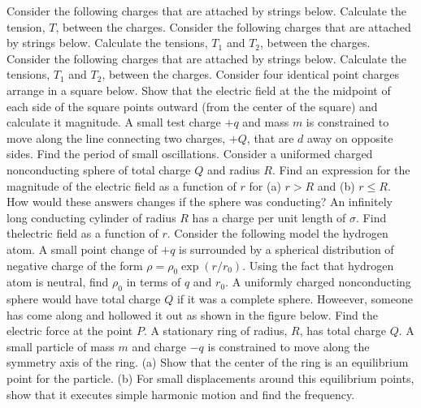 \documentclass[12pt]{article}
\begin{document}
\pagestyle{empty}
\noindent Consider the following charges that are attached by strings below.  Calculate the tension, $T$, between the charges.
\newpage
\noindent Consider the following charges that are attached by strings below.  Calculate the tensions, $T_1$ and $T_2$, between the charges.
\newpage 
\noindent Consider the following charges that are attached by strings below.  Calculate the tensions, $T_1$ and $T_2$, between the charges.
\newpage
\noindent Consider four identical point charges arrange in a square below.  Show that the electric field at the the midpoint of each side of the square points outward (from the center of the square) and calculate it magnitude.
\newpage
\noindent A small test charge $+q$ and mass $m$ is constrained to move along the line connecting two charges, $+Q$, that are $d$ away on opposite sides.  Find the period of small oscillations.   
\newpage
\noindent Consider a uniformed charged nonconducting sphere of total charge $Q$ and radius $R$.  Find an expression for the magnitude of the electric field as a function of $r$ for (a) $r>R$ and (b) $r\le R$.  How would these answers changes if the sphere was conducting?
\newpage
\noindent An infinitely long conducting cylinder of radius $R$ has a charge per unit length of $\sigma$.  Find thelectric field as a function of $r$.  
\newpage
\noindent Consider the following model the hydrogen atom.  A small point change of $+q$ is surrounded by a spherical distribution of negative charge of the form $\rho = \rho_0 \exp( r/r_0)$.  Using the fact that hydrogen atom is neutral, find $\rho_0$ in terms of $q$ and $r_0$.
\newpage
\noindent A uniformly charged nonconducting sphere would have total charge $Q$ if it was a complete sphere.  Howeever, someone has come along and hollowed it out as shown in the figure below.  Find the electric force at the point $P$.
\newpage
\noindent A stationary ring of radius, $R$, has total charge $Q$.  A small particle of mass $m$ and charge $-q$ is constrained to move along the symmetry axis of the ring.  (a) Show that the center of the ring is an equilibrium point for the particle. (b) For small displacements around this equilibrium points, show that it executes simple harmonic motion and find the frequency.    
\end{document}
